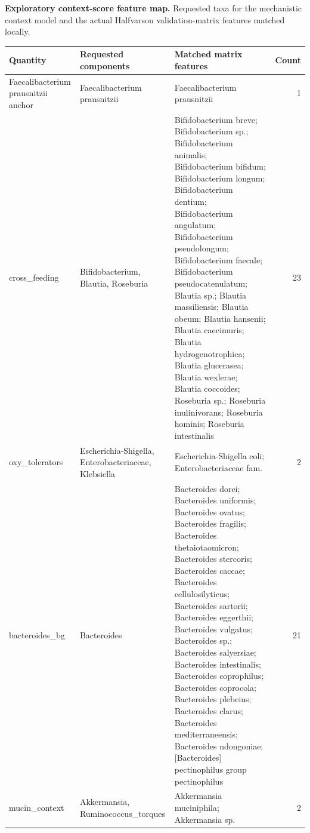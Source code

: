 \noindent\textbf{Exploratory context-score feature map.} Requested taxa for the mechanistic context model and the actual Halfvarson validation-matrix features matched locally.

\begin{center}
\scriptsize
\begin{tabularx}{\textwidth}{@{} l Y Y r @{}}
\toprule
Quantity & Requested components & Matched matrix features & Count \\
\midrule
Faecalibacterium prausnitzii anchor & Faecalibacterium prausnitzii & Faecalibacterium prausnitzii & 1 \\
cross\_feeding & Bifidobacterium, Blautia, Roseburia & Bifidobacterium breve; Bifidobacterium sp.; Bifidobacterium animalis; Bifidobacterium bifidum; Bifidobacterium longum; Bifidobacterium dentium; Bifidobacterium angulatum; Bifidobacterium pseudolongum; Bifidobacterium faecale; Bifidobacterium pseudocatenulatum; Blautia sp.; Blautia massiliensis; Blautia obeum; Blautia hansenii; Blautia caecimuris; Blautia hydrogenotrophica; Blautia glucerasea; Blautia wexlerae; Blautia coccoides; Roseburia sp.; Roseburia inulinivorans; Roseburia hominis; Roseburia intestinalis & 23 \\
oxy\_tolerators & Escherichia-Shigella, Enterobacteriaceae, Klebsiella & Escherichia-Shigella coli; Enterobacteriaceae fam. & 2 \\
bacteroides\_bg & Bacteroides & Bacteroides dorei; Bacteroides uniformis; Bacteroides ovatus; Bacteroides fragilis; Bacteroides thetaiotaomicron; Bacteroides stercoris; Bacteroides caccae; Bacteroides cellulosilyticus; Bacteroides sartorii; Bacteroides eggerthii; Bacteroides vulgatus; Bacteroides sp.; Bacteroides salyersiae; Bacteroides intestinalis; Bacteroides coprophilus; Bacteroides coprocola; Bacteroides plebeius; Bacteroides clarus; Bacteroides mediterraneensis; Bacteroides ndongoniae; [Bacteroides] pectinophilus group pectinophilus & 21 \\
mucin\_context & Akkermansia, Ruminococcus\_torques & Akkermansia muciniphila; Akkermansia sp. & 2 \\
\bottomrule
\end{tabularx}
\end{center}

